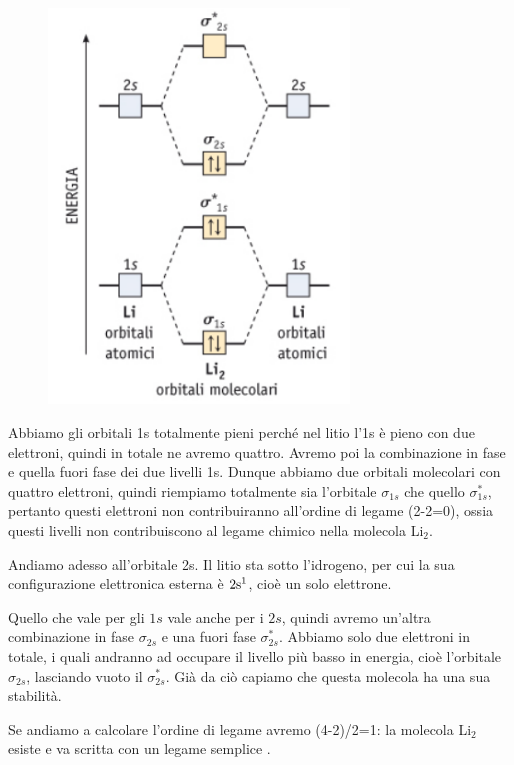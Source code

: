 \begin{figure}[H]
    \centering
    \includegraphics[width=8cm]{immagini/orbitali_molecolari_Li_2.png}
\end{figure}

Abbiamo gli orbitali 1s totalmente pieni perché nel litio l'1s è pieno con due elettroni, quindi in totale ne avremo quattro. Avremo poi la combinazione in fase e quella fuori fase dei due livelli 1s. Dunque abbiamo due orbitali molecolari con quattro elettroni, quindi riempiamo totalmente sia l'orbitale $\sigma_{1s}$ che quello $\sigma^*_{1s}$, pertanto questi elettroni non contribuiranno all'ordine di legame (2-2=0), ossia questi livelli non contribuiscono al legame chimico nella molecola Li$_2$.

\vspace{0.2cm}Andiamo adesso all'orbitale 2s. Il litio sta sotto l'idrogeno, per cui la sua configurazione elettronica esterna è $\rm 2s^1$, cioè un solo elettrone.
    
Quello che vale per gli $1s$ vale anche per i $2s$, quindi avremo un'altra combinazione in fase $\sigma_{2s}$ e una fuori fase $\sigma_{2s}^*$. Abbiamo solo due elettroni in totale, i quali andranno ad occupare il livello più basso in energia, cioè l'orbitale $\sigma_{2s}$, lasciando vuoto il $\sigma_{2s}^*$. Già da ciò capiamo che questa molecola ha una sua stabilità.

\vspace{0.2cm}Se andiamo a calcolare l'ordine di legame avremo (4-2)/2=1: la molecola Li$_2$ esiste e va scritta con un legame semplice .

